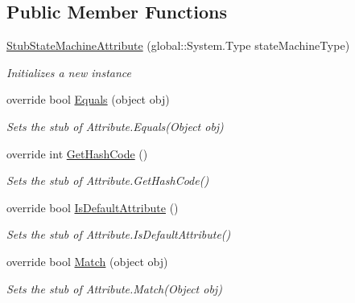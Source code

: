 \subsection*{Public Member Functions}
\begin{DoxyCompactItemize}
\item 
\hyperlink{class_system_1_1_runtime_1_1_compiler_services_1_1_fakes_1_1_stub_state_machine_attribute_ad3bc7513fd3a9a1f7b1bad984190ac50}{Stub\-State\-Machine\-Attribute} (global\-::\-System.\-Type state\-Machine\-Type)
\begin{DoxyCompactList}\small\item\em Initializes a new instance\end{DoxyCompactList}\item 
override bool \hyperlink{class_system_1_1_runtime_1_1_compiler_services_1_1_fakes_1_1_stub_state_machine_attribute_af3fbebdc1e586992bbaf2f2fc6520a58}{Equals} (object obj)
\begin{DoxyCompactList}\small\item\em Sets the stub of Attribute.\-Equals(\-Object obj)\end{DoxyCompactList}\item 
override int \hyperlink{class_system_1_1_runtime_1_1_compiler_services_1_1_fakes_1_1_stub_state_machine_attribute_a7ab6e48940ab9810b16c9788f83b1b58}{Get\-Hash\-Code} ()
\begin{DoxyCompactList}\small\item\em Sets the stub of Attribute.\-Get\-Hash\-Code()\end{DoxyCompactList}\item 
override bool \hyperlink{class_system_1_1_runtime_1_1_compiler_services_1_1_fakes_1_1_stub_state_machine_attribute_aea2eb093cd37c7320ec2bdebcf4a1e71}{Is\-Default\-Attribute} ()
\begin{DoxyCompactList}\small\item\em Sets the stub of Attribute.\-Is\-Default\-Attribute()\end{DoxyCompactList}\item 
override bool \hyperlink{class_system_1_1_runtime_1_1_compiler_services_1_1_fakes_1_1_stub_state_machine_attribute_af695b985a90b7c20cec293096c570505}{Match} (object obj)
\begin{DoxyCompactList}\small\item\em Sets the stub of Attribute.\-Match(\-Object obj)\end{DoxyCompactList}\end{DoxyCompactItemize}
